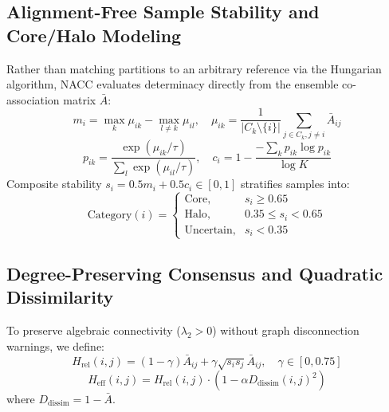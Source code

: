 \documentclass[journal]{IEEEtran}
\begin{document}
\subsection{Alignment-Free Sample Stability and Core/Halo Modeling}
Rather than matching partitions to an arbitrary reference via the Hungarian algorithm, NACC evaluates determinacy directly from the ensemble co-association matrix $\bar{A}$:
\begin{equation}
m_i = \max_k \mu_{ik} - \max_{l \neq k} \mu_{il}, \quad \mu_{ik} = \frac{1}{|C_k \setminus \{i\}|} \sum_{j \in C_k, j \neq i} \bar{A}_{ij}
\end{equation}
\begin{equation}
p_{ik} = \frac{\exp(\mu_{ik}/\tau)}{\sum_l \exp(\mu_{il}/\tau)}, \quad c_i = 1 - \frac{-\sum_k p_{ik} \log p_{ik}}{\log K}
\end{equation}
Composite stability $s_i = 0.5 m_i + 0.5 c_i \in [0, 1]$ stratifies samples into:
\begin{equation}
\text{Category}(i) = \begin{cases}
\text{Core}, & s_i \ge 0.65 \\
\text{Halo}, & 0.35 \le s_i < 0.65 \\
\text{Uncertain}, & s_i < 0.35
\end{cases}
\end{equation}

\subsection{Degree-Preserving Consensus and Quadratic Dissimilarity}
To preserve algebraic connectivity ($\lambda_2 > 0$) without graph disconnection warnings, we define:
\begin{equation}
H_{\text{rel}}(i, j) = (1 - \gamma) \bar{A}_{ij} + \gamma \sqrt{s_i s_j} \bar{A}_{ij}, \quad \gamma \in [0, 0.75]
\end{equation}
\begin{equation}
H_{\text{eff}}(i, j) = H_{\text{rel}}(i, j) \cdot \left(1 - \alpha D_{\text{dissim}}(i, j)^2\right)
\end{equation}
where $D_{\text{dissim}} = 1 - \bar{A}$.
\end{document}
